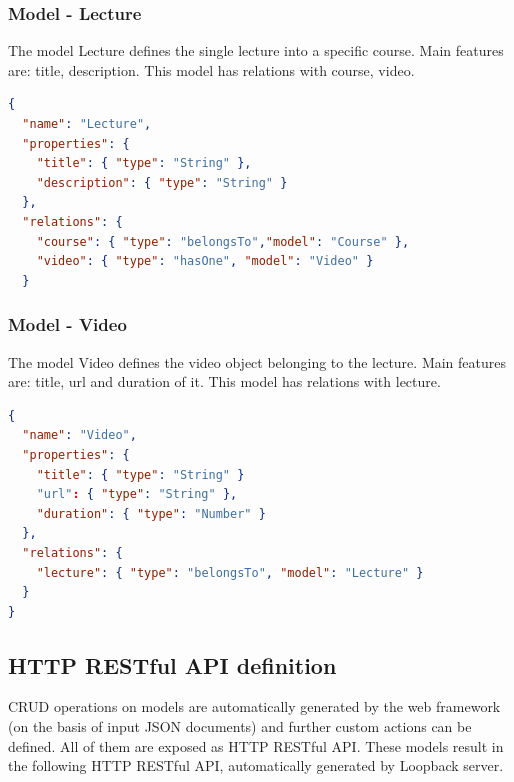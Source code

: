 \subsubsection{ Model - Lecture}

The model Lecture defines the single lecture into a specific course. Main features are: title, description. This model has relations with course, video.


\begin{lstlisting}[language=json]
{
  "name": "Lecture",
  "properties": {
    "title": { "type": "String" },
    "description": { "type": "String" }
  },
  "relations": {
    "course": { "type": "belongsTo","model": "Course" },
    "video": { "type": "hasOne", "model": "Video" }
  }

\end{lstlisting}

\subsubsection{ Model - Video}

The model Video defines the video object belonging to the lecture. Main features are: title, url and duration of it. This model has relations with lecture.


\begin{lstlisting}[language=json]
{
  "name": "Video",
  "properties": {
    "title": { "type": "String" }
    "url": { "type": "String" },
    "duration": { "type": "Number" }
  },
  "relations": {
    "lecture": { "type": "belongsTo", "model": "Lecture" }
  }
}

\end{lstlisting}


\subsection {HTTP RESTful API definition}
\label{subsec:HTTP_RESTful_API_definition}

CRUD operations on models are automatically generated by the web framework (on the basis of input JSON documents) and further custom actions can be defined. All of them are exposed as HTTP RESTful API.
These models result in the following HTTP RESTful API, automatically generated by Loopback server.


